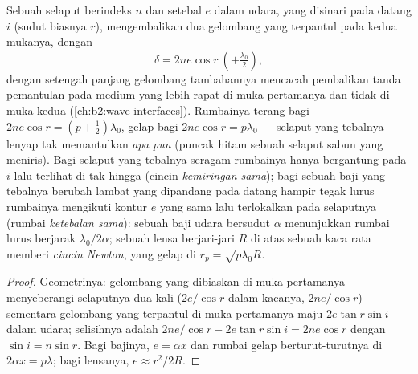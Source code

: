 \begin{proposition}\label{prop:b2:two-wave-interference:film}
Sebuah selaput berindeks $n$ dan setebal $e$ dalam udara, yang disinari pada datang $i$
(sudut biasnya $r$), mengembalikan dua gelombang yang terpantul pada kedua mukanya,
dengan 
\[
\delta = 2ne\cos r \ (+\tfrac{\lambda_0}2) ,
\]
dengan setengah panjang gelombang tambahannya mencacah pembalikan tanda pemantulan
pada medium yang lebih rapat di muka pertamanya dan tidak di muka kedua
(\cref{ch:b2:wave-interfaces}). Rumbainya terang bagi $2ne\cos r =
(p + \tfrac12)\lambda_0$, gelap bagi $2ne\cos r = p\lambda_0$ --- selaput yang tebalnya
lenyap tak memantulkan \emph{apa pun} (puncak hitam sebuah selaput sabun
yang meniris). Bagi selaput yang tebalnya seragam rumbainya hanya bergantung pada $i$
lalu terlihat di tak hingga (cincin \emph{kemiringan sama}); bagi
sebuah baji yang tebalnya berubah lambat yang dipandang pada datang hampir tegak lurus rumbainya
mengikuti kontur $e$ yang sama lalu terlokalkan pada selaputnya
(rumbai \emph{ketebalan sama}): sebuah baji udara bersudut $\alpha$ menunjukkan
rumbai lurus berjarak $\lambda_0/2\alpha$; sebuah lensa berjari-jari $R$ di atas sebuah kaca rata memberi
\emph{cincin Newton}, yang gelap di $r_p = \sqrt{p\lambda_0R}$.
\end{proposition}

\begin{proof}
Geometrinya: gelombang yang dibiaskan di muka pertamanya menyeberangi selaputnya dua kali
($2e/\cos r$ dalam kacanya,  $2ne/\cos r$) sementara gelombang yang terpantul
di muka pertamanya maju $2e\tan r\sin i$ dalam udara; selisihnya adalah
$2ne/\cos r - 2e\tan r\sin i = 2ne\cos r$ dengan $\sin i = n\sin r$. Bagi
bajinya, $e = \alpha x$ dan rumbai gelap berturut-turutnya di $2\alpha x = p\lambda$; bagi
lensanya, $e \approx r^2/2R$.
\end{proof}

